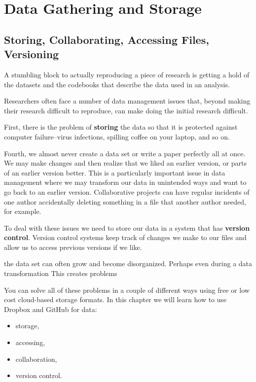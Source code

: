 \documentclass[ChapterTOCs,krantz1]{krantz}\usepackage{graphicx, color}
\begin{document}
{{\part{Data Gathering and Storage}





\chapter{Storing, Collaborating, Accessing Files, Versioning}\label{Storing}

A stumbling block to actually reproducing a piece of research is getting a hold of the datasets and the codebooks that describe the data used in
an analysis.

Researchers often face a number of data management issues that, beyond
making their research difficult to reproduce, can make doing the initial
research difficult.

First, there is the problem of \textbf{storing} the data so that it is
protected against computer failure--virus infections, spilling coffee on
your laptop, and so on.

Fourth, we almost never create a data set or write a paper perfectly all
at once. We may make changes and then realize that we liked an earlier
version, or parts of an earlier version better. This is a particularly
important issue in data management where we may transform our data in
unintended ways and want to go back to an earlier version. Collaborative
projects can have regular incidents of one author accidentally deleting
something in a file that another author needed, for example.

To deal with these issues we need to store our data in a system that has
\textbf{version control}. Version control systems keep track of changes
we make to our files and allow us to access previous versions if we
like.

the data set can often grow and become disorganized. Perhaps even during
a data transformation This creates problems

You can solve all of these problems in a couple of different ways using
free or low cost cloud-based storage formats. In this chapter we will
learn how to use Dropbox and GitHub for data:

\begin{itemize}
    \item storage,
    \item accessing,
    \item collaboration,
    \item version control.
\end{itemize}

}}
\end{document}

